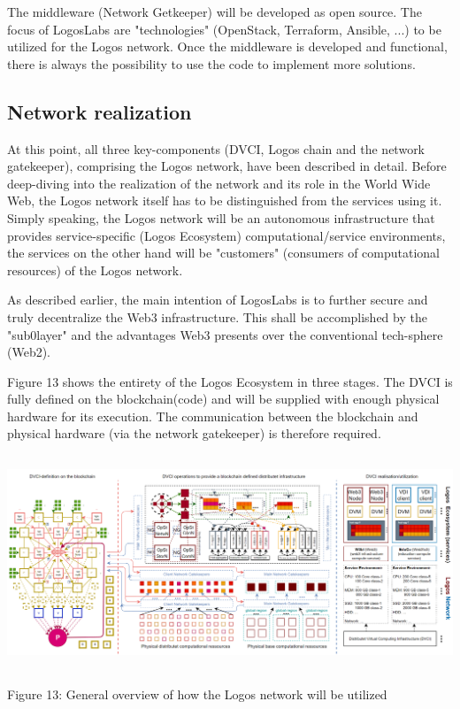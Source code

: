 \documentclass[]{article}
\begin{document}
The middleware (Network Getkeeper) will be developed as open source.
The focus of LogosLabs are "technologies" (OpenStack, Terraform, Ansible, ...) to be utilized for the Logos network.
Once the middleware is developed and functional, there is always the possibility to use the code to implement more solutions.  

\subsection{Network realization}
At this point, all three key-components (DVCI, Logos chain and the network gatekeeper), comprising the Logos network, have been described in detail. 
Before deep-diving into the realization of the network and its role in the World Wide Web, the Logos network itself has to be distinguished from the services using it. 
Simply speaking, the Logos network will be an autonomous infrastructure that provides service-specific (Logos Ecosystem) computational/service environments, the services on the other hand will be "customers" (consumers of computational resources) of the Logos network.

As described earlier, the main intention of LogosLabs is to further secure and truly decentralize the Web3 infrastructure. 
This shall be accomplished by the "sub0layer" and the advantages Web3 presents over the conventional tech-sphere (Web2).

Figure 13 shows the entirety of the Logos Ecosystem in three stages.
The DVCI is fully defined on the blockchain(code) and will be supplied with enough physical hardware for its execution. 
The communication between the blockchain and physical hardware (via the network gatekeeper) is therefore required.    

\begin{center}
	\includegraphics[height=6.4cm]{network-implementation}
\end{center}
\begin{center}
	Figure 13: General overview of how the Logos network will be utilized
\end{center}
\end{document}

